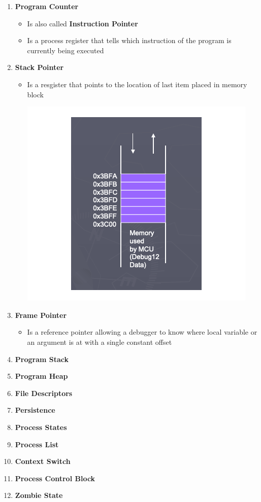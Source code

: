 \documentclass[12pt]{article}
\begin{document}
\begin{mdframed}
\begin{enumerate}[1.]
\begin{itemize}
    \end{itemize}
    \item \textbf{Program Counter}
    \begin{itemize}
        \item Is also called \textbf{Instruction Pointer}
        \item Is a process register that tells which instruction of the program
        is currently being executed
    \end{itemize}
    \item \textbf{Stack Pointer}
    \begin{itemize}
        \item Is a resgister that points to the location of last item placed in memory block

        \begin{center}
        \includegraphics[width=0.5\linewidth]{images/notes_4_2.png}
        \end{center}
    \end{itemize}
    \item \textbf{Frame Pointer}
    \begin{itemize}
        \item Is a reference pointer allowing a debugger to know where local
        variable or an argument is at with a single constant offset
    \end{itemize}
    \item \textbf{Program Stack}
    \item \textbf{Program Heap}
    \item \textbf{File Descriptors}
    \item \textbf{Persistence}
    \item \textbf{Process States}
    \item \textbf{Process List}
    \item \textbf{Context Switch}
    \item \textbf{Process Control Block}
    \item \textbf{Zombie State}
\end{enumerate}

\end{mdframed}
\end{document}
